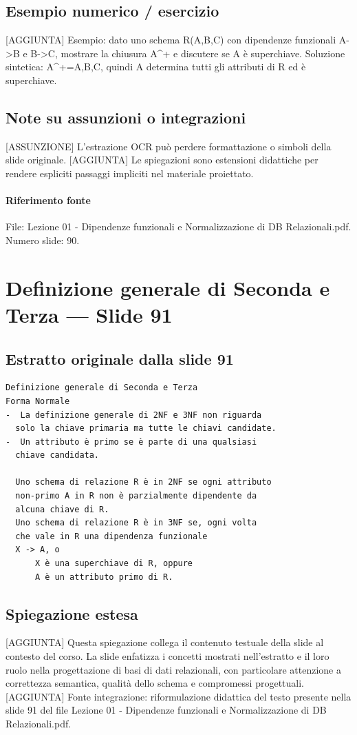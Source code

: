 \documentclass[11pt]{article}
\begin{document}
\subsection*{Esempio numerico / esercizio}
[AGGIUNTA] Esempio: dato uno schema R(A,B,C) con dipendenze funzionali A->B e B->C, mostrare la chiusura A^+ e discutere se A è superchiave. Soluzione sintetica: A^+={A,B,C}, quindi A determina tutti gli attributi di R ed è superchiave.
\subsection*{Note su assunzioni o integrazioni}
[ASSUNZIONE] L'estrazione OCR può perdere formattazione o simboli della slide originale.
[AGGIUNTA] Le spiegazioni sono estensioni didattiche per rendere espliciti passaggi impliciti nel materiale proiettato.
\paragraph{Riferimento fonte} File: Lezione 01 - Dipendenze funzionali e Normalizzazione di DB Relazionali.pdf. Numero slide: 90.
\section{Definizione generale di Seconda e Terza --- Slide 91}
\subsection*{Estratto originale dalla slide 91}
\begin{lstlisting}
Definizione generale di Seconda e Terza
Forma Normale
-  La definizione generale di 2NF e 3NF non riguarda
  solo la chiave primaria ma tutte le chiavi candidate.
-  Un attributo è primo se è parte di una qualsiasi
  chiave candidata.

  Uno schema di relazione R è in 2NF se ogni attributo
  non-primo A in R non è parzialmente dipendente da
  alcuna chiave di R.
  Uno schema di relazione R è in 3NF se, ogni volta
  che vale in R una dipendenza funzionale
  X -> A, o
      X è una superchiave di R, oppure
      A è un attributo primo di R.
\end{lstlisting}
\subsection*{Spiegazione estesa}
[AGGIUNTA] Questa spiegazione collega il contenuto testuale della slide al contesto del corso. La slide enfatizza i concetti mostrati nell'estratto e il loro ruolo nella progettazione di basi di dati relazionali, con particolare attenzione a correttezza semantica, qualità dello schema e compromessi progettuali.
[AGGIUNTA] Fonte integrazione: riformulazione didattica del testo presente nella slide 91 del file Lezione 01 - Dipendenze funzionali e Normalizzazione di DB Relazionali.pdf.
\end{document}
